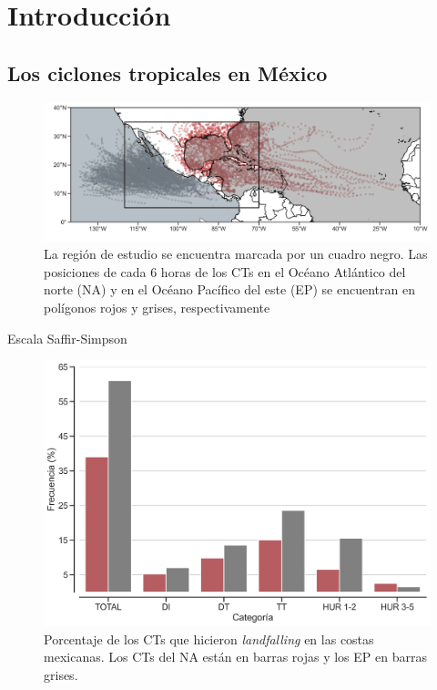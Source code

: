 \section{Introducción}
\subsection{Los ciclones tropicales en México}
\begin{frame}
    \begin{figure}[H]
        \centering
        \includegraphics[scale = 0.275]{Images/Figures/Fig_2_1.jpeg}
        \caption{La región de estudio se encuentra marcada por un cuadro negro. Las posiciones de cada 6 horas de los CTs en el Océano Atlántico del norte (NA) y en el Océano Pacífico del este (EP) se encuentran en polígonos rojos y grises, respectivamente}
        \label{fig:fig_1}
    \end{figure}
\end{frame}

\begin{frame}{Escala Saffir-Simpson}
    
\end{frame}

\begin{frame}
    \begin{figure}
        \centering
        \includegraphics[scale=0.35]{Images/Figures/Fig_1_1.jpeg}
        \caption{Porcentaje de los CTs que hicieron \textit{landfalling} en las costas mexicanas. Los CTs del NA están en barras rojas  y los EP en barras grises.}
        \label{fig:fig_2}
    \end{figure}
\end{frame}

